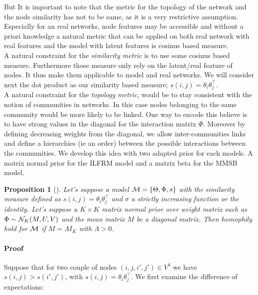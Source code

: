 \documentclass[a4paper, 12pt]{article}
\newtheorem{proposition}{Proposition}[section]
\begin{document}
But It is important to note that the metric for the topology of the network and the node similarity has not to be same, as it is a very restrictive assumption. Especially for an real networks, node features may be accessible and without a priori knowledge a natural metric that can be applied on both real network with real features and the model with latent features is cosinus based measure.~\\

A natural constraint for the \emph{similarity metric} is to use some cosinus based measure. Furthermore those measure only rely on the latent/real feature of nodes. It thus make them applicable to model and real networks. We will consider next the dot product as our similarity based measure; $s(i,j) = \theta_i \theta_j^\top$.~\\

A natural constraint for the \emph{topology metric}, would be to stay consistent with the notion of communities in networks. In this case nodes belonging to the same community would be more likely to be linked. One way to encode this believe is to have strong values in the diagonal for the interaction matrix $\Phi$. Moreover by defining decreasing weights from the diagonal, we allow inter-communities links and define a hierarchies (ie an order) between the possible interactions between the communities. We develop this idea with two adapted prior for each models. A matrix normal prior for the ILFRM model and a matrix beta for the MMSB model.~\\


\begin{proposition}[] \label{prop:hom_mn}
Let's suppose a model $ \mathcal{M}=\{\Theta, \Phi, s\}$ with the similarity measure defined as $s(i,j) = \theta_i \theta_j^\top$ and $\sigma$ a strictly increasing function or the identity. Let's suppose a $K\times K$ matrix normal prior over weight matrix such as $\Phi \sim \mathcal{N}_K(M, U, V)$ and the mean matrix $M$ be a diagonal matrix. Then homophily hold for $\mathcal{M}$ if $M=\Lambda I_K$ with $\Lambda > 0$.
\end{proposition}
\paragraph{Proof} 
Suppose that for two couple of nodes $(i,j,i',j') \in V^4$ we have $s(i,j) > s(i',j')$, with $s(i,j) =\theta_i \theta_j^\top$. We first examine the difference of expectations:
\end{document}
